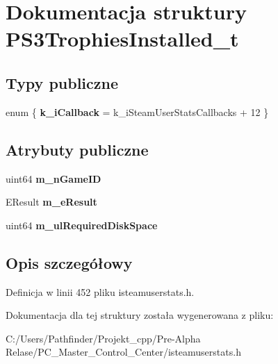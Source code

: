 \hypertarget{struct_p_s3_trophies_installed__t}{}\section{Dokumentacja struktury P\+S3\+Trophies\+Installed\+\_\+t}
\label{struct_p_s3_trophies_installed__t}
\subsection*{Typy publiczne}
\begin{DoxyCompactItemize}
\item 
\mbox{\label{struct_p_s3_trophies_installed__t_ac704026e015e5dca2ac6f37f9dd425e2}} 
enum \{ {\bfseries k\+\_\+i\+Callback} = k\+\_\+i\+Steam\+User\+Stats\+Callbacks + 12
 \}
\end{DoxyCompactItemize}
\subsection*{Atrybuty publiczne}
\begin{DoxyCompactItemize}
\item 
\mbox{\label{struct_p_s3_trophies_installed__t_a8f40f832891bdd1534d8127a578d93b7}} 
uint64 {\bfseries m\+\_\+n\+Game\+ID}
\item 
\mbox{\label{struct_p_s3_trophies_installed__t_af1d76496b91526fc17bcb405b223fd5c}} 
E\+Result {\bfseries m\+\_\+e\+Result}
\item 
\mbox{\label{struct_p_s3_trophies_installed__t_ae0a6172acff00609cc2ef3465e22bdb9}} 
uint64 {\bfseries m\+\_\+ul\+Required\+Disk\+Space}
\end{DoxyCompactItemize}


\subsection{Opis szczegółowy}


Definicja w linii 452 pliku isteamuserstats.\+h.



Dokumentacja dla tej struktury została wygenerowana z pliku\+:\begin{DoxyCompactItemize}
\item 
C\+:/\+Users/\+Pathfinder/\+Projekt\+\_\+cpp/\+Pre-\/\+Alpha Relase/\+P\+C\+\_\+\+Master\+\_\+\+Control\+\_\+\+Center/isteamuserstats.\+h\end{DoxyCompactItemize}
